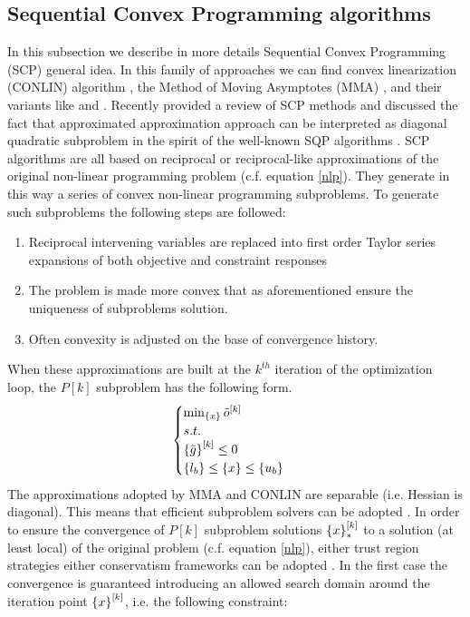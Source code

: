 \subsection{Sequential Convex Programming algorithms}
In this subsection we describe in more details Sequential Convex Programming (SCP) \cite{fleury1993mathematical,zillober2004very,duysinx2009solution} general idea. In this family of approaches we can find convex linearization (CONLIN) algorithm \cite{fleury1986structural}, the Method of Moving Asymptotes (MMA) \cite{svanberg1987method,svanberg2002class}, and their variants like \cite{borrvall2001large,bruyneel2002family} and \cite{zillober2004very}.
Recently \cite{etman2012first} provided a review of SCP methods and discussed the fact that approximated approximation approach \cite{groenwold2010approximated} can be interpreted as diagonal quadratic subproblem in the spirit of the well-known SQP algorithms \cite{nocedal2006sequential}.
SCP algorithms are all based on reciprocal or reciprocal-like approximations of the original non-linear programming problem (c.f. equation \ref{nlp}). They generate in this way  a series of convex non-linear programming subproblems. To generate such subproblems the following steps are followed:
\begin{enumerate}
\item Reciprocal intervening variables are replaced into first order Taylor series expansions of both objective and constraint responses 
\item The problem is made more convex that as aforementioned ensure the uniqueness of subproblems solution.
\item Often convexity is adjusted on the base of convergence history.
\end{enumerate}
When these approximations are built at the $k^{th}$ iteration of the optimization loop, the $P[k]$ subproblem has the following form.
\begin{equation}
\begin{cases}
\min_{\left\lbrace{x}\right \rbrace} \tilde{o}^{[k]}\\
s.t.\\
\left\lbrace{\tilde{g}}\right \rbrace^{[k]}\leq 0\\
\left\lbrace{l_b}\right \rbrace\leq \left\lbrace{x}\right \rbrace\leq \left\lbrace{u_b}\right \rbrace
\end{cases}
\end{equation}
The approximations adopted by MMA and CONLIN are separable (i.e. Hessian is diagonal). This means that efficient subproblem solvers can be adopted \cite{falk1967lagrange,fleury1979structural}. In order to ensure the convergence of $P[k]$ subproblem solutions $\left\lbrace{x}\right \rbrace^{[k]}_*$ to a solution (at least local) of the original problem (c.f. equation \ref{nlp}), either trust region \cite{alexandrov1998trust} strategies either conservatism frameworks \cite{svanberg2002class} can be adopted \cite{etman2012first}. In the first case the convergence is guaranteed introducing an allowed search domain around the iteration point $\left\lbrace{x}\right \rbrace^{[k]}$, i.e. the following constraint: 
